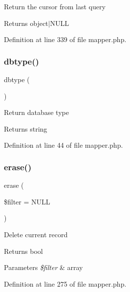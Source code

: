 Return the cursor from last query \begin{DoxyReturn}{Returns}
object$\vert$\+N\+U\+LL 
\end{DoxyReturn}


Definition at line 339 of file mapper.\+php.

\hypertarget{class_d_b_1_1_mongo_1_1_mapper_a38948c2fb1711f49b72f123cbd91e611}{}\label{class_d_b_1_1_mongo_1_1_mapper_a38948c2fb1711f49b72f123cbd91e611} 
\subsubsection{\texorpdfstring{dbtype()}{dbtype()}}
{\footnotesize\ttfamily dbtype (\begin{DoxyParamCaption}{ }\end{DoxyParamCaption})}

Return database type \begin{DoxyReturn}{Returns}
string 
\end{DoxyReturn}


Definition at line 44 of file mapper.\+php.

\hypertarget{class_d_b_1_1_mongo_1_1_mapper_aa7210074cfc1eda78dc492d8b8a96616}{}\label{class_d_b_1_1_mongo_1_1_mapper_aa7210074cfc1eda78dc492d8b8a96616} 
\subsubsection{\texorpdfstring{erase()}{erase()}}
{\footnotesize\ttfamily erase (\begin{DoxyParamCaption}\item[{}]{\$filter = {\ttfamily NULL} }\end{DoxyParamCaption})}

Delete current record \begin{DoxyReturn}{Returns}
bool 
\end{DoxyReturn}

\begin{DoxyParams}{Parameters}
{\em \$filter} & array \\
\hline
\end{DoxyParams}


Definition at line 275 of file mapper.\+php.

